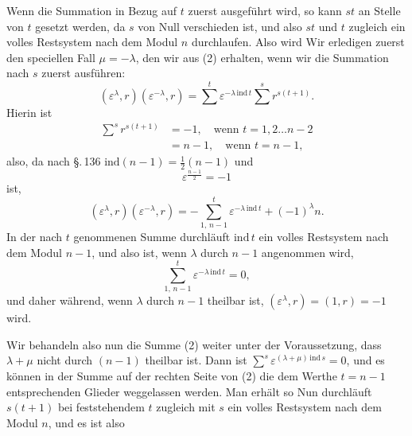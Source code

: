 Wenn die Summation in Bezug auf $t$ zuerst ausgef\"uhrt wird,
so kann $st$ an Stelle von $t$ gesetzt werden, da $s$ von Null verschieden
 ist, und also $st$ und $t$ zugleich ein volles Restsystem
nach dem Modul $n$ durchlaufen. Also wird
Wir erledigen zuerst den speciellen Fall $\mu = -\lambda$, den
wir aus (2) erhalten, wenn wir die Summation nach $s$ zuerst
ausf\"uhren:
\[ (\varepsilon^\lambda, r)(\varepsilon^{-\lambda}, r) = \sum^{t} \varepsilon^{-\lambda\,\mathrm{ind}\,t} \sum^{s} r^{s(t+1)}. \]
Hierin ist
\[
\begin{aligned}
\sum^{s} r^{s(t+1)} &= -1, \quad \text{wenn } t = 1, 2 \ldots n-2\\
&= n-1, \quad \text{wenn } t = n-1,
\end{aligned}
\]
also, da nach \S.\,136 $\mathrm{ind}(n-1) = \frac{1}{2}(n-1)$ und
\[ \varepsilon^{\frac{n-1}{2}} = -1 \]
ist,
\[ (\varepsilon^\lambda, r)(\varepsilon^{-\lambda}, r) = -\sum_{1,\,n-1}^{t} \varepsilon^{-\lambda\,\mathrm{ind}\,t} + (-1)^\lambda n. \]
In der nach $t$ genommenen Summe durchl\"auft $\mathrm{ind}\,t$ ein volles
Restsystem nach dem Modul $n-1$, und also ist, wenn $\lambda$ durch
$n-1$  angenommen wird,
\[ \sum_{1,\,n-1}^{t} \varepsilon^{-\lambda\,\mathrm{ind}\,t} = 0, \]
und daher
w\"ahrend, wenn $\lambda$ durch $n-1$ theilbar ist, $(\varepsilon^\lambda, r) = (1, r) = -1$ wird.

Wir behandeln also nun die Summe (2) weiter unter der
Voraussetzung, dass $\lambda + \mu$ nicht durch $(n-1)$ theilbar ist.
Dann ist $\sum^{s} \varepsilon^{(\lambda+\mu)\,\mathrm{ind}\,s} = 0$, und es k\"onnen in der Summe auf der
rechten Seite von (2) die dem Werthe $t = n-1$ entsprechenden
Glieder weggelassen werden. Man erh\"alt so
Nun durchl\"auft $s(t+1)$ bei feststehendem $t$ zugleich mit $s$
ein volles Restsystem nach dem Modul $n$, und es ist also
